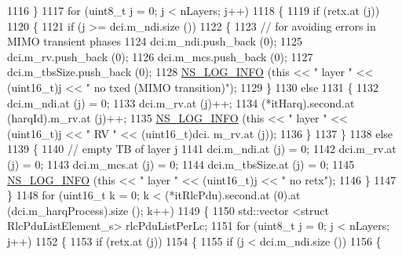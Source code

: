 \begin{DoxyCode}
1116             \}
1117           \textcolor{keywordflow}{for} (uint8\_t j = 0; j < nLayers; j++)
1118             \{
1119               \textcolor{keywordflow}{if} (retx.at (j))
1120                 \{
1121                   \textcolor{keywordflow}{if} (j >= dci.m\_ndi.size ())
1122                     \{
1123                       \textcolor{comment}{// for avoiding errors in MIMO transient phases}
1124                       dci.m\_ndi.push\_back (0);
1125                       dci.m\_rv.push\_back (0);
1126                       dci.m\_mcs.push\_back (0);
1127                       dci.m\_tbsSize.push\_back (0);
1128                       \hyperlink{group__logging_gafbd73ee2cf9f26b319f49086d8e860fb}{NS\_LOG\_INFO} (\textcolor{keyword}{this} << \textcolor{stringliteral}{" layer "} << (uint16\_t)j << \textcolor{stringliteral}{" no txed (MIMO
       transition)"});
1129                     \}
1130                   \textcolor{keywordflow}{else}
1131                     \{
1132                       dci.m\_ndi.at (j) = 0;
1133                       dci.m\_rv.at (j)++;
1134                       (*itHarq).second.at (harqId).m\_rv.at (j)++;
1135                       \hyperlink{group__logging_gafbd73ee2cf9f26b319f49086d8e860fb}{NS\_LOG\_INFO} (\textcolor{keyword}{this} << \textcolor{stringliteral}{" layer "} << (uint16\_t)j << \textcolor{stringliteral}{" RV "} << (uint16\_t)dci.
      m\_rv.at (j));
1136                     \}
1137                 \}
1138               \textcolor{keywordflow}{else}
1139                 \{
1140                   \textcolor{comment}{// empty TB of layer j}
1141                   dci.m\_ndi.at (j) = 0;
1142                   dci.m\_rv.at (j) = 0;
1143                   dci.m\_mcs.at (j) = 0;
1144                   dci.m\_tbsSize.at (j) = 0;
1145                   \hyperlink{group__logging_gafbd73ee2cf9f26b319f49086d8e860fb}{NS\_LOG\_INFO} (\textcolor{keyword}{this} << \textcolor{stringliteral}{" layer "} << (uint16\_t)j << \textcolor{stringliteral}{" no retx"});
1146                 \}
1147             \}
1148           \textcolor{keywordflow}{for} (uint16\_t k = 0; k < (*itRlcPdu).second.at (0).at (dci.m\_harqProcess).size (); k++)
1149             \{
1150               std::vector <struct RlcPduListElement\_s> rlcPduListPerLc;
1151               \textcolor{keywordflow}{for} (uint8\_t j = 0; j < nLayers; j++)
1152                 \{
1153                   \textcolor{keywordflow}{if} (retx.at (j))
1154                     \{
1155                       \textcolor{keywordflow}{if} (j < dci.m\_ndi.size ())
1156                         \{

\end{DoxyCode}
